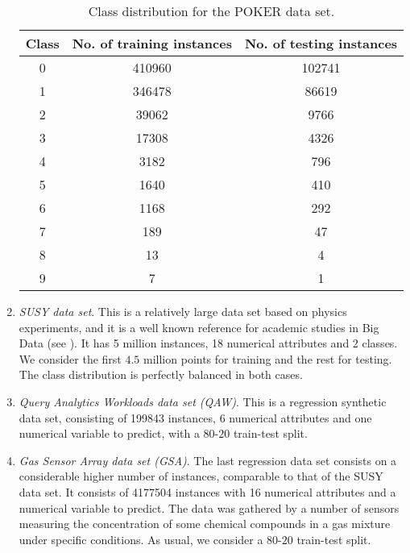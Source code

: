 \begin{enumerate}[1.]
    \begin{table}[h!]
  \centering
  \caption{Class distribution for the POKER data set.}
  \label{tab:poker-class}
  \begin{tabular}{ccc}
    \toprule
Class & No. of training instances & No. of testing instances \\ \midrule
0              & 410960                                & 102741                       \\
1              & 346478                                & 86619                        \\
2              & 39062                                 & 9766                         \\
3              & 17308                                 & 4326                         \\
4              & 3182                                  & 796                          \\
5              & 1640                                  & 410                          \\
6              & 1168                                  & 292                          \\
7              & 189                                   & 47                           \\
8              & 13                                    & 4                            \\
9              & 7                                     & 1\\
  \bottomrule
  \end{tabular}
  \end{table}

\item \textit{SUSY data set}. This is a relatively large data set based on physics experiments, and it is a well known reference for academic studies in Big Data (see \cite {baldi2014searching}). It has 5 million instances, 18 numerical attributes and 2 classes. We consider the first $4.5$ million points for training and the rest for testing. The class distribution is perfectly balanced in both cases.

\item \textit{Query Analytics Workloads data set (QAW)}. This is a regression synthetic data set, consisting of 199843 instances, 6 numerical attributes and one numerical variable to predict, with a $80$-$20$ train-test split.

\item \textit{Gas Sensor Array data set (GSA)}. The last regression data set consists on a considerable higher number of instances, comparable to that of the SUSY data set. It consists of 4177504 instances with 16 numerical attributes and a numerical variable to predict. The data was gathered by a number of sensors measuring the concentration of some chemical compounds in a gas mixture under specific conditions. As usual, we consider a $80$-$20$ train-test split.
\end{enumerate}

